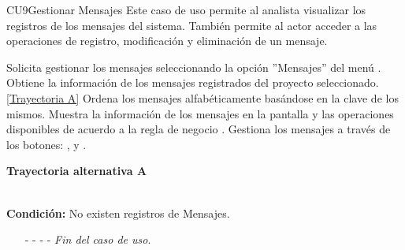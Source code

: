 	\begin{UseCase}{CU9}{Gestionar Mensajes}{
	Este caso de uso permite al analista visualizar los registros de los mensajes del sistema. También permite al actor acceder a las operaciones de registro, modificación y eliminación de un mensaje.
	}
	
\end{UseCase}
\begin{UCtrayectoria}
	\UCpaso[\UCactor] Solicita gestionar los mensajes seleccionando la opción ''Mensajes'' del menú .
	\UCpaso[\UCsist] Obtiene la información de los mensajes registrados del proyecto seleccionado. \hyperlink{CU9:TAA}{[Trayectoria A]}
	\UCpaso[\UCsist] Ordena los mensajes alfabéticamente basándose en la clave de los mismos.
	\UCpaso[\UCsist] Muestra la información de los mensajes en la pantalla  y las operaciones disponibles de acuerdo a la regla de negocio .
	\UCpaso[\UCactor] Gestiona los mensajes a través de los botones: , \editar y \eliminar. \label{CU9-P4}
\end{UCtrayectoria}		
\hypertarget{CU9:TAA}{\textbf{Trayectoria alternativa A}}\\
\noindent \textbf{Condición:} No existen registros de Mensajes.
\begin{enumerate}
	\UCpaso[\UCsist] Muestra el mensaje  en la pantalla  para indicar que no hay registros de mensajes para mostrar. \label{CU9-TA1}
	\UCpaso[\UCactor] Gestiona los mensajes a través del botón: . 
	\item[- -] - - {\em {Fin del caso de uso}}.%
\end{enumerate}

